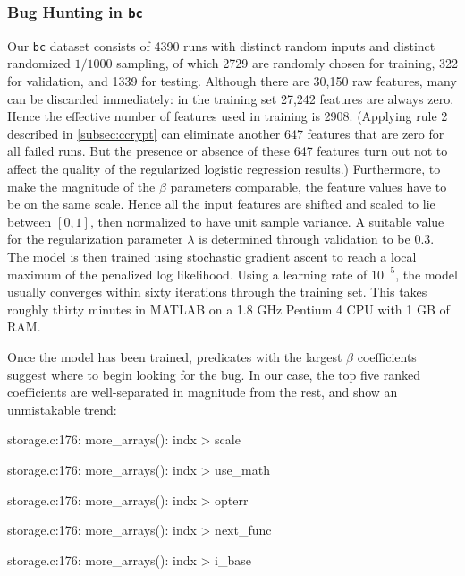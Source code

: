 \subsubsection{Bug Hunting in \texttt{bc}}
Our \texttt{bc} dataset consists of 4390 runs with distinct random
inputs and distinct randomized $1/1000$ sampling, of which 2729 are
randomly chosen for training, 322 for validation, and 1339 for
testing.  Although there are 30,150 raw features, many can be
discarded immediately: in the training set 27,242 features are always
zero.  Hence the effective number of features used in training is
2908.  (Applying rule 2 described in \autoref{subsec:ccrypt}
can eliminate another 647 features that are zero for all failed runs.
But the presence or absence of these 647 features turn out not to
affect the quality of the regularized logistic regression results.)
Furthermore, to make the magnitude of the $\beta$ parameters
comparable, the feature values have to be on the same scale.  Hence
all the input features are shifted and scaled to lie between $[0,1]$,
then normalized to have unit sample variance.  A suitable value for
the regularization parameter $\lambda$ is determined through
validation to be $0.3$.  The model is then trained using stochastic
gradient ascent to reach a local maximum of the penalized log
likelihood.  Using a learning rate of $10^{-5}$, the model usually
converges within sixty iterations through the training set.  This
takes roughly thirty minutes in MATLAB on a 1.8 GHz Pentium 4 CPU with
1 GB of RAM.

Once the model has been trained, predicates with the largest $\beta$
coefficients suggest where to begin looking for the bug.  In our case,
the top five ranked coefficients are well-separated in magnitude from
the rest, and show an unmistakable trend:

\begin{list}{.}{\setlength{\itemsep}{0pt}\setlength{\parsep}{0in}\ttfamily\small}
\item storage.c:176: more\_arrays(): indx > scale
\item storage.c:176: more\_arrays(): indx > use\_math
\item storage.c:176: more\_arrays(): indx > opterr
\item storage.c:176: more\_arrays(): indx > next\_func
\item storage.c:176: more\_arrays(): indx > i\_base
\end{list}

